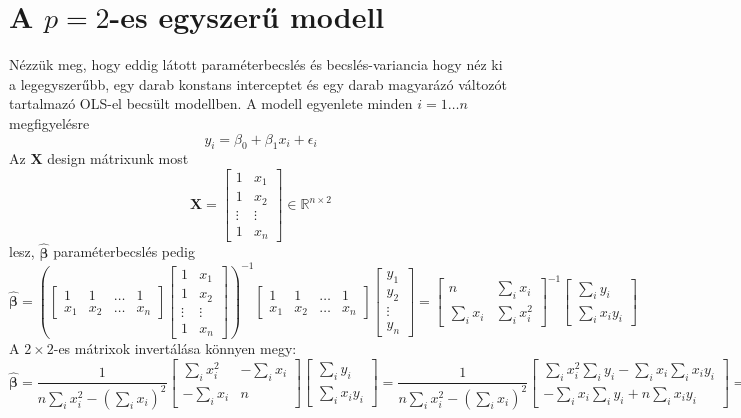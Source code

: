 \documentclass[14p]{report}
\def\pmb{\boldsymbol}
\def\ebeta{\hat{\pmb{\beta}}}
\def\e{\epsilon}
\begin{document}
\section{A $p=2$-es egyszerű modell}
Nézzük meg, hogy eddig látott paraméterbecslés és becslés-variancia hogy néz ki a legegyszerűbb, egy darab konstans interceptet és egy darab magyarázó változót tartalmazó OLS-el becsült modellben. A modell egyenlete minden $i = 1 \dots n$ megfigyelésre
\[
	y_i = \beta_0 + \beta_1 x_i + \e_i
\]
Az $\pmb{X}$ design mátrixunk most
\[
	\pmb{X}=
	\begin{bmatrix}
	1 & x_1 \\
	1 & x_2 \\
	\vdots & \vdots \\
	1 & x_n
	\end{bmatrix} \in \mathbb{R}^{n \times 2}
\]
lesz, $\ebeta$ paraméterbecslés pedig
\[
	\ebeta = 
	\left(\begin{bmatrix}
		1 & 1 & \dots & 1 \\
		x_1 & x_2 & \dots & x_n
	\end{bmatrix}
	\begin{bmatrix}
		1 & x_1 \\
		1 & x_2 \\
		\vdots & \vdots \\
		1 & x_n
	\end{bmatrix}\right)^{-1}
	\begin{bmatrix}
		1 & 1 & \dots & 1 \\
		x_1 & x_2 & \dots & x_n
	\end{bmatrix}
	\begin{bmatrix}
	y_1 \\
	y_2 \\
	\vdots \\
	y_n
	\end{bmatrix}
	=
	\begin{bmatrix}
	n & \sum_i{x_i} \\
	\sum_i{x_i} & \sum_i{x_i^2}
	\end{bmatrix}^{-1}
	\begin{bmatrix}
	\sum_i{y_i} \\
	\sum_i{x_i y_i}
	\end{bmatrix}
\]
A $2 \times 2$-es mátrixok invertálása könnyen megy:
\[
	\ebeta = 
	\frac{1}{n\sum_i{x_i^2} - (\sum_i{x_i})^2}
	\begin{bmatrix}
	\sum_i{x_i^2} & -\sum_i{x_i} \\
	-\sum_i{x_i} & n 
	\end{bmatrix}
	\begin{bmatrix}
	\sum_i{y_i} \\
	\sum_i{x_i y_i}
	\end{bmatrix}
	=
	\frac{1}{n\sum_i{x_i^2} - (\sum_i{x_i})^2}
	\begin{bmatrix}
	\sum_i{x_i^2}\sum_i{y_i} - \sum_i{x_i}\sum_i{x_i y_i} \\
	-\sum_i{x_i}\sum_i{y_i} + n\sum_i{x_i y_i}
	\end{bmatrix}
	=
\]
\end{document}
